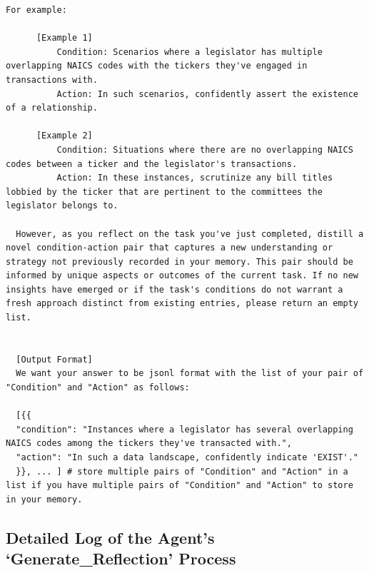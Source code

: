 \documentclass[15pt,letterpaper]{article}
\begin{document}
\begin{Verbatim}[breaklines=true, frame=single]
  For example:

      [Example 1]
          Condition: Scenarios where a legislator has multiple overlapping NAICS codes with the tickers they've engaged in transactions with.
          Action: In such scenarios, confidently assert the existence of a relationship.

      [Example 2]
          Condition: Situations where there are no overlapping NAICS codes between a ticker and the legislator's transactions.
          Action: In these instances, scrutinize any bill titles lobbied by the ticker that are pertinent to the committees the legislator belongs to.

  However, as you reflect on the task you've just completed, distill a novel condition-action pair that captures a new understanding or strategy not previously recorded in your memory. This pair should be informed by unique aspects or outcomes of the current task. If no new insights have emerged or if the task's conditions do not warrant a fresh approach distinct from existing entries, please return an empty list.


  [Output Format]
  We want your answer to be jsonl format with the list of your pair of "Condition" and "Action" as follows:

  [{{
  "condition": "Instances where a legislator has several overlapping NAICS codes among the tickers they've transacted with.",
  "action": "In such a data landscape, confidently indicate 'EXIST'."
  }}, ... ] # store multiple pairs of "Condition" and "Action" in a list if you have multiple pairs of "Condition" and "Action" to store in your memory.
\end{Verbatim}


\subsection*{Detailed Log of the Agent's `Generate\_Reflection' Process}\label{app:log:reflect}
\end{document}
